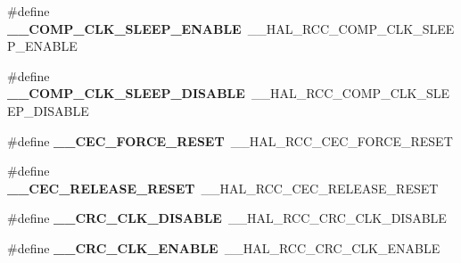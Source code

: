\begin{DoxyCompactItemize}
\item 
\hypertarget{group___h_a_l___r_c_c___aliased_ga7f3baf67404cc71a6c2b4e822daf84b4}{\#define {\bfseries \-\_\-\-\_\-\-C\-O\-M\-P\-\_\-\-C\-L\-K\-\_\-\-S\-L\-E\-E\-P\-\_\-\-E\-N\-A\-B\-L\-E}~\-\_\-\-\_\-\-H\-A\-L\-\_\-\-R\-C\-C\-\_\-\-C\-O\-M\-P\-\_\-\-C\-L\-K\-\_\-\-S\-L\-E\-E\-P\-\_\-\-E\-N\-A\-B\-L\-E}\label{group___h_a_l___r_c_c___aliased_ga7f3baf67404cc71a6c2b4e822daf84b4}

\item 
\hypertarget{group___h_a_l___r_c_c___aliased_ga4fdd3a1c0df6042d50c0a047a886f9db}{\#define {\bfseries \-\_\-\-\_\-\-C\-O\-M\-P\-\_\-\-C\-L\-K\-\_\-\-S\-L\-E\-E\-P\-\_\-\-D\-I\-S\-A\-B\-L\-E}~\-\_\-\-\_\-\-H\-A\-L\-\_\-\-R\-C\-C\-\_\-\-C\-O\-M\-P\-\_\-\-C\-L\-K\-\_\-\-S\-L\-E\-E\-P\-\_\-\-D\-I\-S\-A\-B\-L\-E}\label{group___h_a_l___r_c_c___aliased_ga4fdd3a1c0df6042d50c0a047a886f9db}

\item 
\hypertarget{group___h_a_l___r_c_c___aliased_gaa0ae35657ca362e06303e65c49af90ca}{\#define {\bfseries \-\_\-\-\_\-\-C\-E\-C\-\_\-\-F\-O\-R\-C\-E\-\_\-\-R\-E\-S\-E\-T}~\-\_\-\-\_\-\-H\-A\-L\-\_\-\-R\-C\-C\-\_\-\-C\-E\-C\-\_\-\-F\-O\-R\-C\-E\-\_\-\-R\-E\-S\-E\-T}\label{group___h_a_l___r_c_c___aliased_gaa0ae35657ca362e06303e65c49af90ca}

\item 
\hypertarget{group___h_a_l___r_c_c___aliased_gac2245e2719e46e154ed818c690ed2ec8}{\#define {\bfseries \-\_\-\-\_\-\-C\-E\-C\-\_\-\-R\-E\-L\-E\-A\-S\-E\-\_\-\-R\-E\-S\-E\-T}~\-\_\-\-\_\-\-H\-A\-L\-\_\-\-R\-C\-C\-\_\-\-C\-E\-C\-\_\-\-R\-E\-L\-E\-A\-S\-E\-\_\-\-R\-E\-S\-E\-T}\label{group___h_a_l___r_c_c___aliased_gac2245e2719e46e154ed818c690ed2ec8}

\item 
\hypertarget{group___h_a_l___r_c_c___aliased_ga74ee972cc90d4c53df5ee0a143c7d383}{\#define {\bfseries \-\_\-\-\_\-\-C\-R\-C\-\_\-\-C\-L\-K\-\_\-\-D\-I\-S\-A\-B\-L\-E}~\-\_\-\-\_\-\-H\-A\-L\-\_\-\-R\-C\-C\-\_\-\-C\-R\-C\-\_\-\-C\-L\-K\-\_\-\-D\-I\-S\-A\-B\-L\-E}\label{group___h_a_l___r_c_c___aliased_ga74ee972cc90d4c53df5ee0a143c7d383}

\item 
\hypertarget{group___h_a_l___r_c_c___aliased_ga212c2a16ed2c43e0123d70cc9c87bfa7}{\#define {\bfseries \-\_\-\-\_\-\-C\-R\-C\-\_\-\-C\-L\-K\-\_\-\-E\-N\-A\-B\-L\-E}~\-\_\-\-\_\-\-H\-A\-L\-\_\-\-R\-C\-C\-\_\-\-C\-R\-C\-\_\-\-C\-L\-K\-\_\-\-E\-N\-A\-B\-L\-E}\label{group___h_a_l___r_c_c___aliased_ga212c2a16ed2c43e0123d70cc9c87bfa7}


\end{DoxyCompactItemize}
